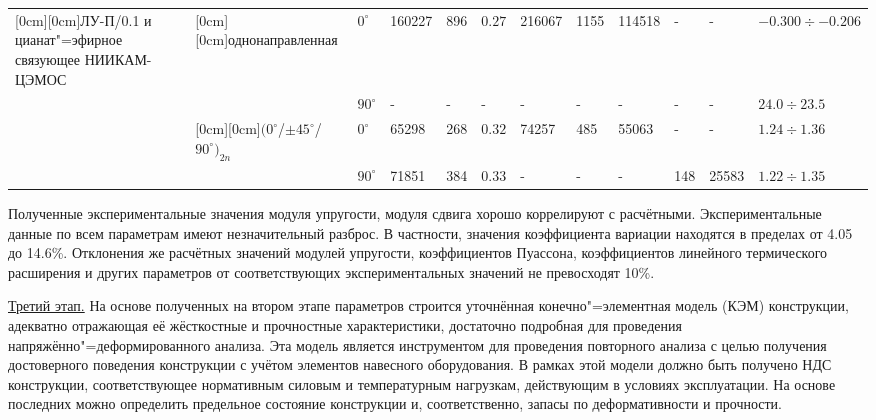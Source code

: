 \begin{table}[h!]
\begin{tabular}[h]{|p{8mm}|p{8mm}|p{6mm}|p{6mm}|p{5mm}|p{8mm}|p{6mm}|p{6mm}|p{8mm}|p{4mm}|p{5mm}|p{20mm}|}
\hline

\raisebox{-4.50ex}[0cm][0cm]{\tiny ЛУ-П/0.1 и цианат"=эфирное связующее НИИКАМ-ЦЭМОС}&

\raisebox{-1.50ex}[0cm][0cm]{\tiny однонаправленная}&

\tiny $0^\circ$& \tiny 160227& \tiny 896& \tiny $0.27$& \tiny 216067& \tiny 1155& \tiny 114518& -& -& \tiny $-0.300\div-0.206$ \\

\cline{3-12}

 &  & \tiny $90^\circ$& -& -& -& -& -& -& -& -& \tiny $24.0\div23.5$ \\

\cline{2-12}

 &

\raisebox{-1.50ex}[0cm][0cm]{\tiny $(0^\circ$/$\pm45^\circ$/$90^\circ)_{2n}$}&

\tiny $0^\circ$& \tiny 65298& \tiny 268& \tiny $0.32$& \tiny 74257& \tiny 485& \tiny 55063& -& -& \tiny $1.24\div1.36$ \\

\cline{3-12}

 &  & \tiny $90^\circ$& \tiny 71851& \tiny 384& \tiny $0.33$& -& -& -& \tiny 148& \tiny 25583& \tiny $1.22\div1.35$ \\

\hline

\end{tabular}

\end{table}



Полученные экспериментальные значения модуля упругости, модуля сдвига хорошо коррелируют с расчётными. Экспериментальные данные по всем параметрам имеют незначительный разброс. В частности, значения коэффициента вариации находятся в пределах от 4.05 до 14.6{\%}. Отклонения же расчётных значений модулей упругости, коэффициентов Пуассона, коэффициентов линейного термического расширения и других параметров от соответствующих экспериментальных значений не превосходят 10\%.



\underline {Третий этап.} На основе полученных на втором этапе параметров строится уточнённая конечно"=элементная модель (КЭМ) конструкции, адекватно отражающая её жёсткостные и прочностные характеристики, достаточно подробная для проведения напряжённо"=деформированного анализа. Эта модель является инструментом для проведения повторного анализа с целью получения достоверного поведения конструкции с учётом элементов навесного оборудования. В рамках этой модели должно быть получено НДС конструкции, соответствующее нормативным силовым и температурным нагрузкам, действующим в условиях эксплуатации. На основе последних можно определить предельное состояние конструкции и, соответственно, запасы по деформативности и прочности.



